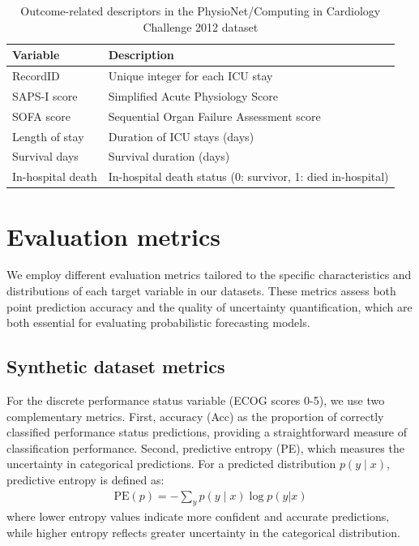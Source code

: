 \documentclass[preprint,12pt]{elsarticle}
\begin{document}
\begin{table}[h!]
    \centering
    \caption{Outcome-related descriptors in the PhysioNet/Computing in Cardiology Challenge 2012 dataset}
    \small\begin{tabularx}{\textwidth}{lX}
        \toprule
        \textbf{Variable} & \textbf{Description} \\
        \midrule
        RecordID          & Unique integer for each ICU stay \\
        SAPS-I score      & Simplified Acute Physiology Score~\citep{le1984simplified} \\
        SOFA score        & Sequential Organ Failure Assessment score~\citep{ferreira2001serial} \\
        Length of stay    & Duration of ICU stays (days) \\
        Survival days     & Survival duration (days) \\
        In-hospital death & In-hospital death status (0: survivor, 1: died in-hospital) \\
        \bottomrule
    \end{tabularx}
    \label{tab:icu_outcome_descriptors}
\end{table}

\section{Evaluation metrics}
We employ different evaluation metrics tailored to the specific characteristics and distributions of each target variable in our datasets.
These metrics assess both point prediction accuracy and the quality of uncertainty quantification, which are both essential for evaluating probabilistic forecasting models.

\subsection{Synthetic dataset metrics} 
For the discrete performance status variable (ECOG scores 0-5), we use two complementary metrics. First, accuracy (Acc) as the proportion of correctly classified performance status predictions, providing a straightforward measure of classification performance. Second, predictive entropy (PE), which measures the uncertainty in categorical predictions. For a predicted distribution $p(y \mid x)$, predictive entropy is defined as:
\begin{align}
  \text{PE}(p) = -\sum_{y} p(y \mid x) \log p(y|x)  
\end{align}
where lower entropy values indicate more confident and accurate predictions, while higher entropy reflects greater uncertainty in the categorical distribution.
\end{document}
